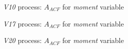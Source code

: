 \documentclass[12 pt]{scrartcl}
\begin{document}
\begin{figure}[H]
  \caption{\emph{V10} process: $A_{ACF}$ for \emph{moment} variable}
  \label{fig:v10-moment-aacf}
\end{figure}



\begin{figure}[H]
  \caption{\emph{V17} process: $A_{ACF}$ for \emph{moment} variable}
  \label{fig:v17-moment-aacf}
\end{figure}


\begin{figure}[H]
  \caption{\emph{V20} process: $A_{ACF}$ for \emph{moment} variable}
  \label{fig:v20-moment-aacf}
\end{figure}
\end{document}
